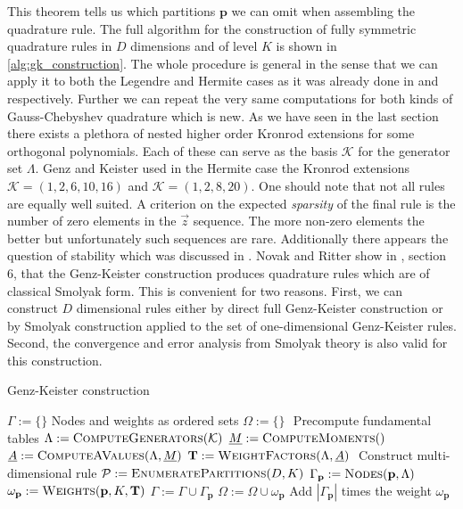 \documentclass[a4paper,10pt]{article}
\begin{document}
This theorem tells us which partitions $\mathbf{p}$ we can omit when assembling
the quadrature rule. The full algorithm for the construction of fully symmetric quadrature
rules in $D$ dimensions and of level $K$ is shown in \eqref{alg:gk_construction}.
The whole procedure is general in the sense that we can apply it to both the Legendre and
Hermite cases as it was already done in \cite{genz} and \cite{genz_keister} respectively.
Further we can repeat the very same computations for both kinds of Gauss-Chebyshev
quadrature which is new. As we have seen in the last section there exists a plethora
of nested higher order Kronrod extensions for some orthogonal polynomials. Each of these
can serve as the basis $\mathcal{K}$ for the generator set $\Lambda$. Genz and Keister used in
the Hermite case the Kronrod extensions $\mathcal{K} = (1, 2, 6, 10, 16)$ and $\mathcal{K} = (1, 2, 8, 20)$.
One should note that not all rules are equally well suited. A criterion on the expected
\emph{sparsity} of the final rule is the number of zero elements in the $\vec{z}$ sequence.
The more non-zero elements the better but unfortunately such sequences are rare.
Additionally there appears the question of stability which was discussed in \cite{genz}.
Novak and Ritter show in \cite{novak_ritter}, section 6, that the Genz-Keister construction
produces quadrature rules which are of classical Smolyak form. This is convenient
for two reasons. First, we can construct $D$ dimensional rules either by direct full
Genz-Keister construction or by Smolyak construction applied to the set of one-dimensional
Genz-Keister rules. Second, the convergence and error analysis from Smolyak theory is
also valid for this construction.


\begin{algorithm}[h!]
  \caption{Genz-Keister construction}
  \label{alg:gk_construction}
  \begin{algorithmic}
      \State $\Gamma := \{\}$
      \Comment Nodes and weights as ordered sets
      \State $\Omega := \{\}$
      \State $ $
      \Comment Precompute fundamental tables
      \State $\Lambda := \textsc{ComputeGenerators}(\mathcal{K})$
      \State $\vec{M} := \textsc{ComputeMoments}()$
      \State $\vec{A} := \textsc{ComputeAValues}(\Lambda, \vec{M})$
      \State $\mat{T} := \textsc{WeightFactors}(\Lambda, \vec{A})$
      \State $ $
      \Comment Construct multi-dimensional rule
      \State $\mathcal{P} := \textsc{EnumeratePartitions}(D, K)$
          \State $\Gamma_\mathbf{p} := \textsc{Nodes}(\mathbf{p}, \Lambda)$
          \State $\omega_\mathbf{p} := \textsc{Weights}(\mathbf{p}, K, \mat{T})$
          \State $\Gamma := \Gamma \cup \Gamma_\mathbf{p}$
          \State $\Omega := \Omega \cup \omega_\mathbf{p}$
          \Comment Add $|\Gamma_\mathbf{p}|$ times the weight $\omega_\mathbf{p}$
        \EndIf
      \EndFor
    \EndProcedure
  \end{algorithmic}
\end{algorithm}
\end{document}
